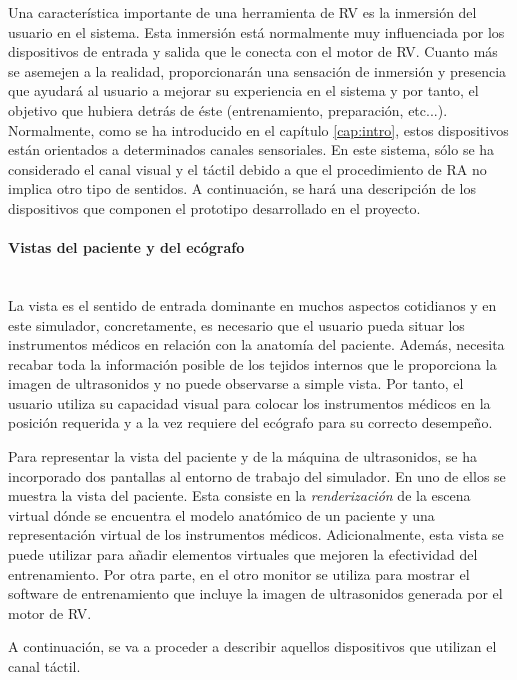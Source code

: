 Una característica importante de una herramienta de \ac{RV} es la inmersión del usuario en el sistema. Esta inmersión está normalmente muy influenciada por los dispositivos de entrada y salida que le conecta con el motor de \ac{RV}. Cuanto más se asemejen a la realidad, proporcionarán una sensación de inmersión y presencia que ayudará al usuario a mejorar su experiencia en el sistema y por tanto, el objetivo que hubiera detrás de éste (entrenamiento, preparación, etc...). Normalmente, como se ha introducido en el capítulo \ref{cap:intro}, estos dispositivos están orientados a determinados canales sensoriales. En este sistema, sólo se ha considerado el canal visual y el táctil debido a que el procedimiento de \ac{RA} no implica otro tipo de sentidos. A continuación, se hará una descripción de los dispositivos que componen el prototipo desarrollado en el proyecto.

\paragraph{Vistas del paciente y del ecógrafo}\mbox{}\\

La vista es el sentido de entrada dominante en muchos aspectos cotidianos y en este simulador, concretamente, es necesario que el usuario pueda situar los instrumentos médicos en relación con la anatomía del paciente. Además, necesita recabar toda la información posible de los tejidos internos que le proporciona la imagen de ultrasonidos y no puede observarse a simple vista. Por tanto, el usuario utiliza su capacidad visual para colocar los instrumentos médicos en la posición requerida y a la vez requiere del ecógrafo para su correcto desempeño.

Para representar la vista del paciente y de la máquina de ultrasonidos, se ha incorporado dos pantallas al entorno de trabajo del simulador. 
En uno de ellos se muestra la vista del paciente. Esta consiste en la \emph{renderización} de la escena virtual dónde se encuentra el modelo anatómico de un paciente y una representación virtual de los instrumentos médicos. Adicionalmente, esta vista se puede utilizar para añadir elementos virtuales que mejoren la efectividad del entrenamiento. 
Por otra parte, en el otro monitor se utiliza para mostrar el software de entrenamiento que incluye la imagen de ultrasonidos generada por el motor de \ac{RV}.

A continuación, se va a proceder a describir aquellos dispositivos que utilizan el canal táctil. 

